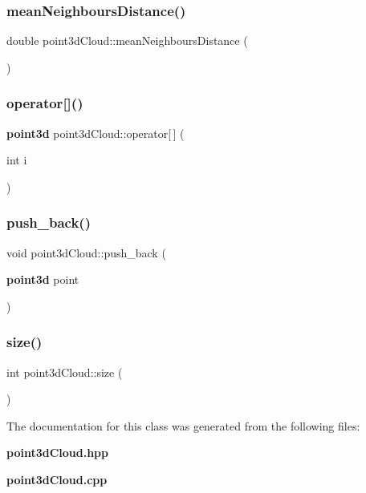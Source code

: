 \subsubsection{mean\+Neighbours\+Distance()}
{\footnotesize\ttfamily double point3d\+Cloud\+::mean\+Neighbours\+Distance (\begin{DoxyParamCaption}{ }\end{DoxyParamCaption})}

\mbox{\label{classpoint3d_cloud_ab39c301d72157f68789b2fda42636432}} 
\subsubsection{operator[]()}
{\footnotesize\ttfamily \textbf{ point3d} point3d\+Cloud\+::operator[$\,$] (\begin{DoxyParamCaption}\item[{int}]{i }\end{DoxyParamCaption})}

\mbox{\label{classpoint3d_cloud_a84c558258478bc6728e6545d8f4b8d02}} 
\subsubsection{push\+\_\+back()}
{\footnotesize\ttfamily void point3d\+Cloud\+::push\+\_\+back (\begin{DoxyParamCaption}\item[{\textbf{ point3d}}]{point }\end{DoxyParamCaption})}

\mbox{\label{classpoint3d_cloud_aa4fe8d4a3f3f93691741e301f767ff7f}} 
\subsubsection{size()}
{\footnotesize\ttfamily int point3d\+Cloud\+::size (\begin{DoxyParamCaption}{ }\end{DoxyParamCaption})}



The documentation for this class was generated from the following files\+:\begin{DoxyCompactItemize}
\item 
\textbf{ point3d\+Cloud.\+hpp}\item 
\textbf{ point3d\+Cloud.\+cpp}\end{DoxyCompactItemize}
